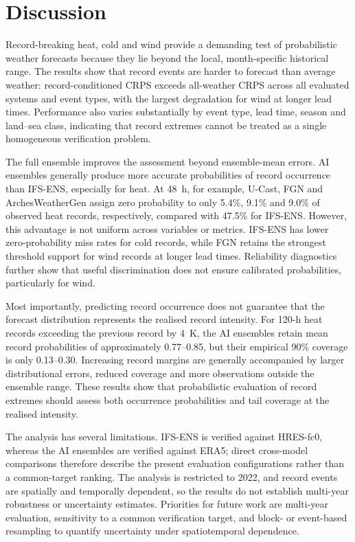 \documentclass[11pt]{article}
\begin{document}
\section{Discussion}

Record-breaking heat, cold and wind provide a demanding test of probabilistic weather forecasts because they lie beyond the local, month-specific historical range. The results show that record events are harder to forecast than average weather: record-conditioned CRPS exceeds all-weather CRPS across all evaluated systems and event types, with the largest degradation for wind at longer lead times. Performance also varies substantially by event type, lead time, season and land--sea class, indicating that record extremes cannot be treated as a single homogeneous verification problem.

The full ensemble improves the assessment beyond ensemble-mean errors. AI ensembles generally produce more accurate probabilities of record occurrence than IFS-ENS, especially for heat. At 48~h, for example, U-Cast, FGN and ArchesWeatherGen assign zero probability to only 5.4\%, 9.1\% and 9.0\% of observed heat records, respectively, compared with 47.5\% for IFS-ENS. However, this advantage is not uniform across variables or metrics. IFS-ENS has lower zero-probability miss rates for cold records, while FGN retains the strongest threshold support for wind records at longer lead times. Reliability diagnostics further show that useful discrimination does not ensure calibrated probabilities, particularly for wind.

Most importantly, predicting record occurrence does not guarantee that the forecast distribution represents the realised record intensity. For 120-h heat records exceeding the previous record by 4~K, the AI ensembles retain mean record probabilities of approximately 0.77--0.85, but their empirical 90\% coverage is only 0.13--0.30. Increasing record margins are generally accompanied by larger distributional errors, reduced coverage and more observations outside the ensemble range. These results show that probabilistic evaluation of record extremes should assess both occurrence probabilities and tail coverage at the realised intensity.

The analysis has several limitations. IFS-ENS is verified against HRES-fc0, whereas the AI ensembles are verified against ERA5; direct cross-model comparisons therefore describe the present evaluation configurations rather than a common-target ranking. The analysis is restricted to 2022, and record events are spatially and temporally dependent, so the results do not establish multi-year robustness or uncertainty estimates. Priorities for future work are multi-year evaluation, sensitivity to a common verification target, and block- or event-based resampling to quantify uncertainty under spatiotemporal dependence.
\end{document}
